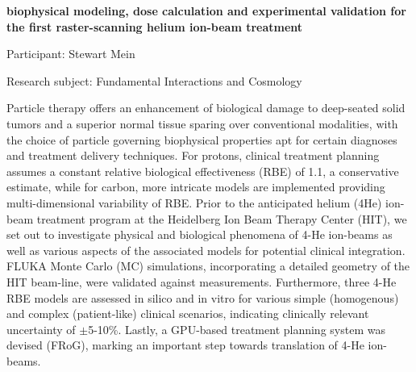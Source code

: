 \hfill 

\begin{minipage}[t]{1.0\textwidth}

\begin{center}

{{\large\bfseries biophysical modeling, dose calculation and experimental validation for the first raster-scanning helium ion-beam treatment}\par}

\end{center}

{\noindent Participant: Stewart Mein\par} 

{\noindent Research subject: Fundamental Interactions and Cosmology\par}\medskip

\noindent Particle therapy offers an enhancement of biological damage to deep-seated solid tumors and a superior normal tissue sparing over conventional modalities, with the choice of particle governing biophysical properties apt for certain diagnoses and treatment delivery techniques. For protons, clinical treatment planning assumes a constant relative biological effectiveness (RBE) of 1.1, a conservative estimate, while for carbon, more intricate models are implemented providing multi-dimensional variability of RBE. Prior to the anticipated helium (4He) ion-beam treatment program at the Heidelberg Ion Beam Therapy Center (HIT), we set out to investigate physical and biological phenomena of 4-He ion-beams as well as various aspects of the associated models for potential clinical integration. FLUKA Monte Carlo (MC) simulations, incorporating a detailed geometry of the HIT beam-line, were validated against measurements. Furthermore, three 4-He RBE models are assessed in silico and in vitro for various simple (homogenous) and complex (patient-like) clinical scenarios, indicating clinically relevant uncertainty of $\pm$5-10\%. Lastly, a GPU-based treatment planning system was devised (FRoG), marking an important step towards translation of 4-He ion-beams.\par\end{minipage}

\hfill 

